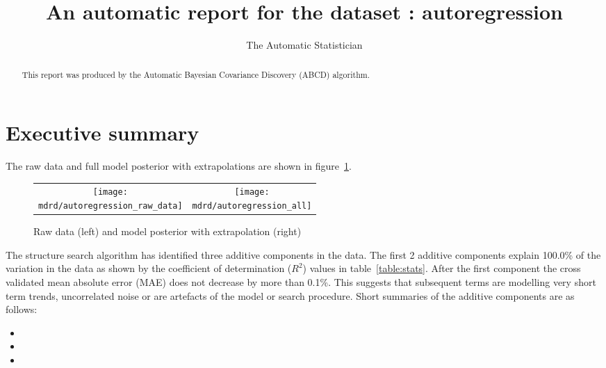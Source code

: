 \documentclass{article} %
\title{An automatic report for the dataset : autoregression}
\author{
The Automatic Statistician
}
\begin{document}
\allowdisplaybreaks

\maketitle

\begin{abstract}
This report was produced by the Automatic Bayesian Covariance Discovery (ABCD) algorithm.
\end{abstract}

\section{Executive summary}

The raw data and full model posterior with extrapolations are shown in figure~\ref{fig:rawandfit}.

\begin{figure}[H]
\newcommand{\wmgd}{0.5\columnwidth}
\newcommand{\hmgd}{3.0cm}
\newcommand{\mdrd}{autoregression}
\newcommand{\mbm}{\hspace{-0.3cm}}
\begin{tabular}{cc}
\mbm \texttt{[image: \\mdrd/autoregression\_raw\_data]} & \texttt{[image: \\mdrd/autoregression\_all]}
\end{tabular}
\caption{Raw data (left) and model posterior with extrapolation (right)}
\label{fig:rawandfit}
\end{figure}

The structure search algorithm has identified three additive components in the data.
The  first 2 additive components explain 100.0\% of the variation in the data as shown by the coefficient of determination ($R^2$) values in table~\ref{table:stats}.
After the first component the cross validated mean absolute error (MAE) does not decrease by more than 0.1\%.
This suggests that subsequent terms are modelling very short term trends, uncorrelated noise or are artefacts of the model or search procedure.
Short summaries of the additive components are as follows:
\begin{itemize}

  \item  

  \item  

  \item  

\end{itemize}
\end{document}
